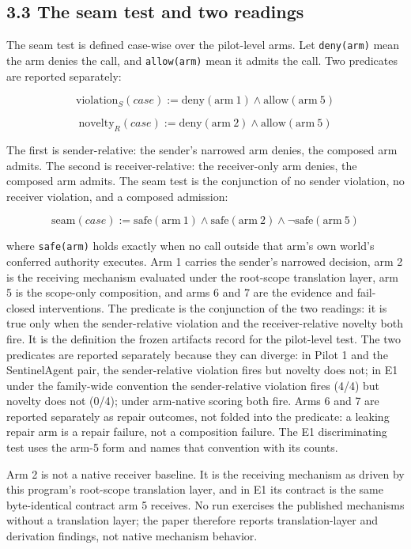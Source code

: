 \documentclass[
  10pt,
]{article}
\let\origtexttt\texttt
\renewcommand{\texttt}[1]{{\upshape\origtexttt{#1}}}
\renewcommand{\_}{\allowbreak\origunderscore}
\begin{document}
\subsection{3.3 The seam test and two
readings}\label{the-seam-test-and-two-readings}

The seam test is defined case-wise over the pilot-level arms. Let
\texttt{deny(arm)} mean the arm denies the call, and \texttt{allow(arm)}
mean it admits the call. Two predicates are reported separately:

\[\mathrm{violation}_{S}(case) := \mathrm{deny}(\mathrm{arm}\ 1) \land \mathrm{allow}(\mathrm{arm}\ 5)\]

\[\mathrm{novelty}_{R}(case) := \mathrm{deny}(\mathrm{arm}\ 2) \land \mathrm{allow}(\mathrm{arm}\ 5)\]

The first is sender-relative: the sender's narrowed arm denies, the
composed arm admits. The second is receiver-relative: the receiver-only
arm denies, the composed arm admits. The seam test is the conjunction of
no sender violation, no receiver violation, and a composed admission:

\[\mathrm{seam}(case) := \mathrm{safe}(\mathrm{arm}\ 1) \land \mathrm{safe}(\mathrm{arm}\ 2) \land \lnot \mathrm{safe}(\mathrm{arm}\ 5)\]

where \texttt{safe(arm)} holds exactly when no call outside that arm's
own world's conferred authority executes. Arm 1 carries the sender's
narrowed decision, arm 2 is the receiving mechanism evaluated under the
root-scope translation layer, arm 5 is the scope-only composition, and
arms 6 and 7 are the evidence and fail-closed interventions. The
predicate is the conjunction of the two readings: it is true only when
the sender-relative violation and the receiver-relative novelty both
fire. It is the definition the frozen artifacts record for the
pilot-level test. The two predicates are reported separately because
they can diverge: in Pilot 1 and the SentinelAgent pair, the
sender-relative violation fires but novelty does not; in E1 under the
family-wide convention the sender-relative violation fires (4/4) but
novelty does not (0/4); under arm-native scoring both fire. Arms 6 and 7
are reported separately as repair outcomes, not folded into the
predicate: a leaking repair arm is a repair failure, not a composition
failure. The E1 discriminating test uses the arm-5 form and names that
convention with its counts.

Arm 2 is not a native receiver baseline. It is the receiving mechanism
as driven by this program's root-scope translation layer, and in E1 its
contract is the same byte-identical contract arm 5 receives. No run
exercises the published mechanisms without a translation layer; the
paper therefore reports translation-layer and derivation findings, not
native mechanism behavior.
\end{document}
